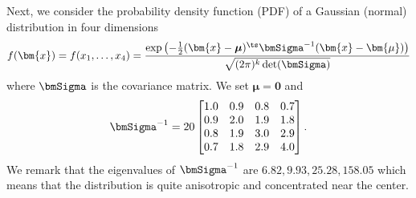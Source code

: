 \documentclass[review,hidelinks,onefignum,onetabnum]{siamart250211}
\begin{document}
Next, we consider the probability density function (PDF) of a Gaussian (normal) distribution in four dimensions
\[
f(\bm{x}) = f(x_1, \dots, x_4) = \frac{\exp\left(-\frac{1}{2} (\bm{x}-\boldsymbol{\mu})^\ts  \bmSigma^{-1} (\bm{x}-\bm{\mu})\right)}{\sqrt{(2\pi)^k \det(\bmSigma)}}
\]
where \(\bmSigma\) is the covariance matrix. 
We set \(\bm{\mu} = \bm{0}\)  and
\begin{equation*}
    \bmSigma^{-1}=20\begin{bmatrix}
    1.0 & 0.9 & 0.8 & 0.7 \\
    0.9 & 2.0 & 1.9 & 1.8 \\
    0.8 & 1.9 & 3.0 & 2.9 \\
    0.7 & 1.8 & 2.9 & 4.0 \\
\end{bmatrix}.
\end{equation*}
We remark that the eigenvalues of 
$\bmSigma^{-1}$ are $6.82,  9.93, 25.28, 158.05$ which means that the distribution is quite anisotropic and concentrated near the center.
\end{document}
